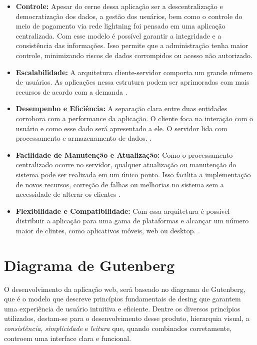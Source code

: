\begin{itemize}
    \item \textbf{Controle:} Apesar do cerne dessa aplicação ser a descentralização e democratização dos dados, a gestão dos usuários, bem como o controle do meio de pagamento via rede lightning foi pensado em uma aplicação centralizada. Com esse modelo é possível garantir a integridade e a consistência das informações. 
    Isso permite que a administração tenha maior controle, minimizando riscos de dados corrompidos ou acesso não autorizado\cite{coulouris2011}.
    
    \item \textbf{Escalabilidade:} A arquitetura cliente-servidor comporta um grande número de usuários. As aplicações nessa estrutura podem ser aprimoradas com mais recursos de acordo com a demanda \cite{coulouris2011}.
    
    \item \textbf{Desempenho e Eficiência:} A separação clara entre duas entidades corrobora com a performance da aplicação. O cliente foca na interação com o usuário e como esse dado será apresentado a ele. O servidor lida com processamento e armazenamento de dados. \cite{coulouris2011}.
    
    \item \textbf{Facilidade de Manutenção e Atualização:} Como o processamento centralizado ocorre no servidor, qualquer atualização ou manutenção do sistema pode ser realizada em um único ponto. Isso facilita a implementação de novos recursos, correção de falhas ou melhorias no sistema sem a necessidade de alterar os clientes \cite{coulouris2011}.
    
    \item \textbf{Flexibilidade e Compatibilidade:} Com essa arquitetura é possível distribuir a aplicação para uma gama de plataformas e alcançar um número maior de clintes, como aplicativos móveis, web ou desktop. \cite{coulouris2011}. 
\end{itemize}

\section{Diagrama de Gutenberg}

O desenvolvimento da aplicação web, será baseado no diagrama de Gutenberg, que é o modelo que descreve princípios fundamentais de desing que garantem uma experiência de usuário intuitiva e eficiente. Dentre os diversos princípios utilizados, destam-se para o desenvolvimento desse produto, {hierarquia visual}, a \textit{consistência}, \textit{simplicidade} e \textit{leitura} que, quando combinados corretamente, controem uma interface clara e funcional.

